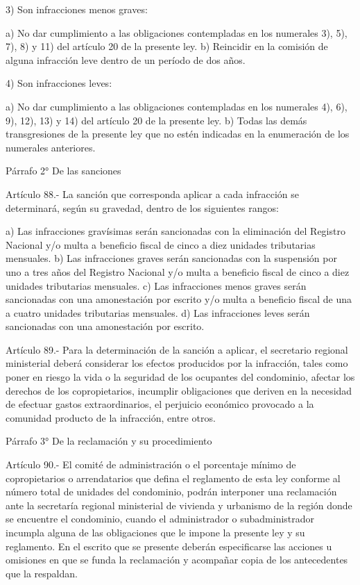     3) Son infracciones menos graves:
     
    a) No dar cumplimiento a las obligaciones contempladas en los numerales 3), 5), 7), 8) y 11) del artículo 20 de la presente ley.
    b) Reincidir en la comisión de alguna infracción leve dentro de un período de dos años.
     
    4) Son infracciones leves:
     
    a) No dar cumplimiento a las obligaciones contempladas en los numerales 4), 6), 9), 12), 13) y 14) del artículo 20 de la presente ley.
    b) Todas las demás transgresiones de la presente ley que no estén indicadas en la enumeración de los numerales anteriores.
     
    Párrafo 2°
    De las sanciones

     
    Artículo 88.- La sanción que corresponda aplicar a cada infracción se determinará, según su gravedad, dentro de los siguientes rangos:
     
    a) Las infracciones gravísimas serán sancionadas con la eliminación del Registro Nacional y/o multa a beneficio fiscal de cinco a diez unidades tributarias mensuales.
    b) Las infracciones graves serán sancionadas con la suspensión por uno a tres años del Registro Nacional y/o multa a beneficio fiscal de cinco a diez unidades tributarias mensuales.
    c) Las infracciones menos graves serán sancionadas con una amonestación por escrito y/o multa a beneficio fiscal de una a cuatro unidades tributarias mensuales.
    d) Las infracciones leves serán sancionadas con una amonestación por escrito.
     
    Artículo 89.- Para la determinación de la sanción a aplicar, el secretario regional ministerial deberá considerar los efectos producidos por la infracción, tales como poner en riesgo la vida o la seguridad de los ocupantes del condominio, afectar los derechos de los copropietarios, incumplir obligaciones que deriven en la necesidad de efectuar gastos extraordinarios, el perjuicio económico provocado a la comunidad producto de la infracción, entre otros.
     
    Párrafo 3°
    De la reclamación y su procedimiento

     
    Artículo 90.- El comité de administración o el porcentaje mínimo de copropietarios o arrendatarios que defina el reglamento de esta ley conforme al número total de unidades del condominio, podrán interponer una reclamación ante la secretaría regional ministerial de vivienda y urbanismo de la región donde se encuentre el condominio, cuando el administrador o subadministrador incumpla alguna de las obligaciones que le impone la presente ley y su reglamento. En el escrito que se presente deberán especificarse las acciones u omisiones en que se funda la reclamación y acompañar copia de los antecedentes que la respaldan.
     
